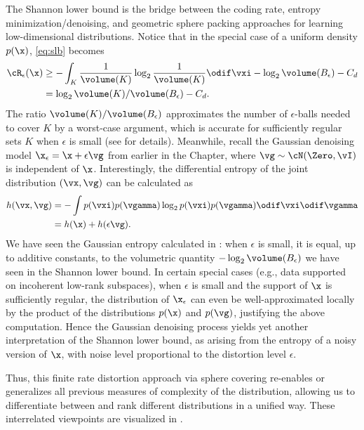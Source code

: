 \documentclass[../../book-main.tex]{subfiles}
\begin{document}
\begin{remark}
	The Shannon lower bound is the bridge between the coding rate, entropy
	minimization/denoising, and geometric sphere packing approaches for learning
	low-dimensional distributions. Notice that in the special case of a uniform
	density $p(\x)$, \eqref{eq:slb} becomes
	\begin{align}
		\cR_{\epsilon}(\x) &\geq -\int_K \frac{1}{\volume(K)} \log_2
		\frac{1}{\volume(K)} \odif \vxi
		- \log_2 \volume(B_{\epsilon}) - C_d
		\\
		&=
		\log_2 \volume(K) / \volume(B_{\epsilon})
		- C_d. \label{eq:shannon-lower-bound-uniform}
	\end{align}
	The ratio $\volume(K) / \volume(B_{\epsilon})$ approximates the number of
	$\epsilon$-balls needed to cover $K$ by a worst-case argument, which is
	accurate for sufficiently regular sets $K$ when $\epsilon$ is small (see
	 for details).
	Meanwhile, recall the Gaussian denoising model $\x_{\epsilon} = \x
	+ \epsilon \vg$ from
	earlier in the Chapter, where $\vg \sim \cN(\Zero, \vI)$ is independent of
	$\x$.
	Interestingly, the differential entropy of the joint distribution $(\vx,
	\vg)$
	can be calculated as
	\begin{align}
		h(\vx, \vg)
		&=
		-\int
		p(\vxi) p(\vgamma) \log_2 p(\vxi) p(\vgamma) \odif \vxi \odif \vgamma
		\\
		&=
		h(\x) + h(\epsilon \vg).
	\end{align}
	We have seen the Gaussian entropy calculated in
	: when $\epsilon$ is small, it is equal, up
	to additive constants, to the volumetric quantity $-\log_2
	\volume(B_{\epsilon})$ we have seen in the Shannon lower bound.
	In certain special cases (e.g., data supported on incoherent low-rank subspaces),
	when $\epsilon$ is small and the support of $\x$ is sufficiently regular,
	the distribution of $\x_{\epsilon}$ can even be well-approximated locally by the
	product of the distributions $p(\x)$ and $p(\vg)$, justifying the above
	computation. 
	Hence the Gaussian denoising process yields yet another interpretation of
	the Shannon lower bound, as arising from the entropy of a noisy version of
	$\x$, with noise level proportional to the distortion level $\epsilon$.


	Thus, this finite rate distortion approach via sphere covering re-enables or
	generalizes all previous measures of complexity of the distribution, allowing us
	to differentiate between and rank different distributions in a unified way.
	These interrelated viewpoints are visualized in .
\end{remark}
\end{document}
